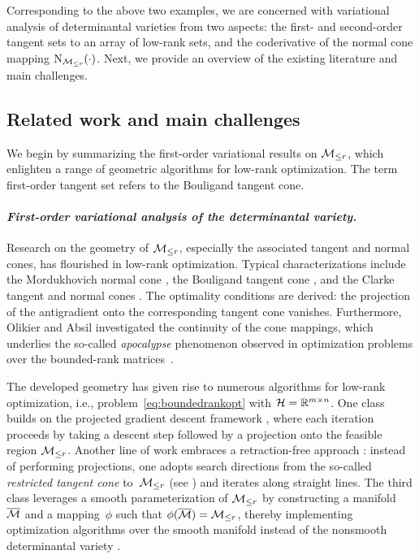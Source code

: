 \medskip

Corresponding to the above two examples, we are concerned with variational analysis of determinantal varieties from two aspects: the first- and second-order tangent sets to an array of low-rank sets, and the coderivative of the normal cone mapping $\mathrm{N}_{\mathcal{M}_{\le r}}(\cdot)$. Next, we provide an overview of the existing literature and main challenges. 


\subsection{Related work and main challenges}\label{sec:relatedwork}
We begin by summarizing the first-order variational results on $\mathcal{M}_{\le r}$, which enlighten a range of geometric algorithms for low-rank optimization. The term first-order tangent set refers to the Bouligand tangent cone.

\paragraph{\emph{\textbf{First-order variational analysis of the determinantal variety.}}} Research on the geometry of $\mathcal{M}_{\le r}$, especially the associated tangent and normal cones, has flourished in low-rank optimization. Typical characterizations include the Mordukhovich normal cone \cite{luke2013Mordukhovichcone}, the Bouligand tangent cone \cite{cason2013iterative,schneider2015Lojaconvergence,olikier2025fourtangentproof}, and the Clarke tangent and normal cones \cite{hosseini2019MordukhovichClarke,li2019optimalitylowrank}. The optimality conditions are derived: the projection of the antigradient onto the corresponding tangent cone vanishes. Furthermore, Olikier and Absil \cite{olikier2022continuity} investigated the continuity of the cone mappings, which underlies the so-called \emph{apocalypse} phenomenon observed in optimization problems over the bounded-rank matrices~\cite{levin2023remedy}. 

The developed geometry has given rise to numerous algorithms for low-rank optimization, i.e., problem~\eqref{eq:boundedrankopt} with $\mathcal{H}=\mathbb{R}^{m\times n}$. One class builds on the projected gradient descent framework \cite{schneider2015Lojaconvergence,olikier2022P2GDR,olikier2025PGD}, where each iteration proceeds by taking a descent step followed by a projection onto the feasible region $\mathcal{M}_{\le r}$. Another line of work embraces a retraction-free approach \cite{schneider2015Lojaconvergence,olikier2023RFDR,olikier2024ERFDR}: instead of performing projections, one adopts search directions from the so-called \emph{restricted tangent cone} to~$\mathcal{M}_{\le r}$ (see \cite{olikier2023RFDR}) and iterates along straight lines. The third class leverages a smooth parameterization of $\mathcal{M}_{\le r}$ by constructing a manifold~$\overline{\mathcal{M}}$ and a mapping~$\phi$ such that $\phi(\overline{\mathcal{M}}) = \mathcal{M}_{\le r}$, thereby implementing optimization algorithms over the smooth manifold instead of the nonsmooth determinantal variety \cite{khrulkov2018desingularization,rebjock2024boundedrank,levin2023remedy,levin2025effect,olikier2025gauss}. 

